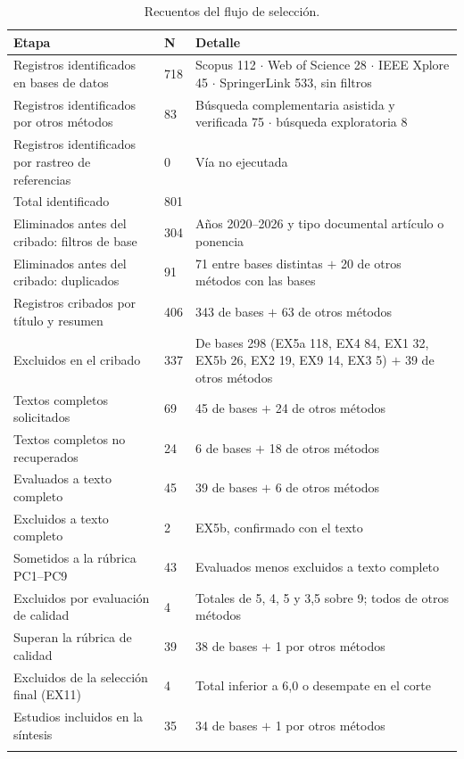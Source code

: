 \documentclass[pdflatex,sn-mathphys-num]{sn-jnl}
\theoremstyle{thmstyleone}
\theoremstyle{thmstyletwo}
\theoremstyle{thmstylethree}
\begin{document}
\begin{table}[h]
\centering
\caption{Recuentos del flujo de selección.}\label{tab:prisma}
\footnotesize
\begin{tabularx}{\textwidth}{@{}Y{1.05}Z{0.3}Y{1.65}@{}}
\toprule
Etapa & N & Detalle \\
\midrule
Registros identificados en bases de datos & 718 & Scopus 112 $\cdot$ Web of Science 28 $\cdot$ IEEE Xplore 45 $\cdot$ SpringerLink 533, sin filtros \\
Registros identificados por otros métodos & 83 & Búsqueda complementaria asistida y verificada 75 $\cdot$ búsqueda exploratoria 8 \\
Registros identificados por rastreo de referencias & 0 & Vía no ejecutada \\
Total identificado & 801 &  \\
\midrule
Eliminados antes del cribado: filtros de base & 304 & Años 2020--2026 y tipo documental artículo o ponencia \\
Eliminados antes del cribado: duplicados & 91 & 71 entre bases distintas $+$ 20 de otros métodos con las bases \\
Registros cribados por título y resumen & 406 & 343 de bases $+$ 63 de otros métodos \\
Excluidos en el cribado & 337 & De bases 298 (EX5a 118, EX4 84, EX1 32, EX5b 26, EX2 19, EX9 14, EX3 5) $+$ 39 de otros métodos \\
\midrule
Textos completos solicitados & 69 & 45 de bases $+$ 24 de otros métodos \\
Textos completos no recuperados & 24 & 6 de bases $+$ 18 de otros métodos \\
Evaluados a texto completo & 45 & 39 de bases $+$ 6 de otros métodos \\
Excluidos a texto completo & 2 & EX5b, confirmado con el texto \\
Sometidos a la rúbrica PC1--PC9 & 43 & Evaluados menos excluidos a texto completo \\
Excluidos por evaluación de calidad & 4 & Totales de 5, 4, 5 y 3,5 sobre 9; todos de otros métodos \\
Superan la rúbrica de calidad & 39 & 38 de bases $+$ 1 por otros métodos \\
Excluidos de la selección final (EX11) & 4 & Total inferior a 6,0 o desempate en el corte \\
\midrule
Estudios incluidos en la síntesis & 35 & 34 de bases $+$ 1 por otros métodos \\
\botrule
\end{tabularx}
\end{table}
\end{document}

